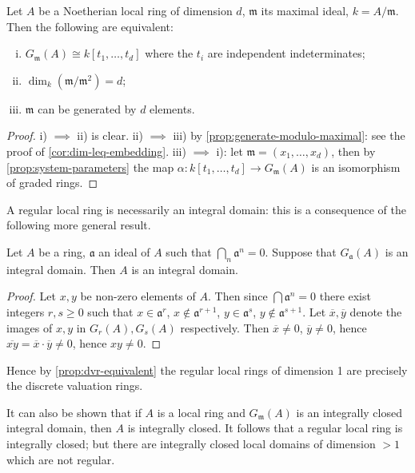 \begin{theorem}\label{thm:regular-equivalence}
Let $A$ be a Noetherian local ring of dimension $d$, $\mathfrak{m}$ its maximal ideal, $k = A/\mathfrak{m}$. Then the following are equivalent:
\begin{enumerate}[i)]
    \item $G_{\mathfrak{m}}(A) \cong k[t_1, \ldots, t_d]$ where the $t_i$ are independent indeterminates;
    \item $\dim_k(\mathfrak{m}/\mathfrak{m}^2) = d$;
    \item $\mathfrak{m}$ can be generated by $d$ elements.
\end{enumerate}
\end{theorem}

\begin{proof}
i) $\implies$ ii) is clear. ii) $\implies$ iii) by \eqref{prop:generate-modulo-maximal}: see the proof of \eqref{cor:dim-leq-embedding}. iii) $\implies$ i): let $\mathfrak{m} = (x_1, \ldots, x_d)$, then by \eqref{prop:system-parameters} the map $\alpha \colon k[t_1, \ldots, t_d] \to G_{\mathfrak{m}}(A)$ is an isomorphism of graded rings.
\end{proof}

A regular local ring is necessarily an integral domain: this is a consequence of the following more general result.

\begin{lemma}\label{lem:graded-domain}
Let $A$ be a ring, $\mathfrak{a}$ an ideal of $A$ such that $\bigcap_n \mathfrak{a}^n = 0$. Suppose that $G_{\mathfrak{a}}(A)$ is an integral domain. Then $A$ is an integral domain.
\end{lemma}

\begin{proof}
Let $x, y$ be non-zero elements of $A$. Then since $\bigcap \mathfrak{a}^n = 0$ there exist integers $r, s \geq 0$ such that $x \in \mathfrak{a}^r$, $x \notin \mathfrak{a}^{r+1}$, $y \in \mathfrak{a}^s$, $y \notin \mathfrak{a}^{s+1}$. Let $\overline{x}, \overline{y}$ denote the images of $x, y$ in $G_r(A), G_s(A)$ respectively. Then $\overline{x} \neq 0$, $\overline{y} \neq 0$, hence $\overline{xy} = \overline{x} \cdot \overline{y} \neq 0$, hence $xy \neq 0$.
\end{proof}

Hence by \eqref{prop:dvr-equivalent} the regular local rings of dimension 1 are precisely the discrete valuation rings.

It can also be shown that if $A$ is a local ring and $G_{\mathfrak{m}}(A)$ is an integrally closed integral domain, then $A$ is integrally closed. It follows that a regular local ring is integrally closed; but there are integrally closed local domains of dimension $> 1$ which are not regular.

